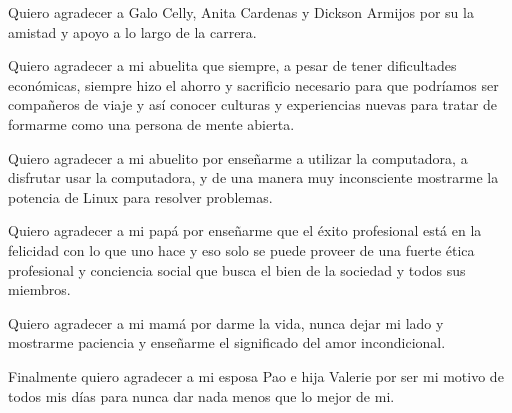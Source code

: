 \documentclass[
11pt, %
spanish, %
singlespacing, %
headsepline, %
]{MastersDoctoralThesis} %
\begin{document}
\begin{acknowledgements}
Quiero agradecer a Galo Celly, Anita Cardenas y Dickson Armijos por su la amistad y apoyo a lo largo de la carrera.

Quiero agradecer a mi abuelita que siempre, a pesar de tener dificultades económicas, siempre hizo el ahorro y sacrificio necesario para que podríamos ser compañeros de viaje y así conocer culturas y experiencias nuevas para tratar de formarme como una persona de mente abierta.

Quiero agradecer a mi abuelito por enseñarme a utilizar la computadora, a disfrutar usar la computadora, y de una manera muy inconsciente mostrarme la potencia de Linux para resolver problemas.

Quiero agradecer a mi papá por enseñarme que el éxito profesional está en la felicidad con lo que uno hace y eso solo se puede proveer de una fuerte ética profesional y conciencia social que busca el bien de la sociedad y todos sus miembros.

Quiero agradecer a mi mamá por darme la vida, nunca dejar mi lado y mostrarme paciencia y enseñarme el significado del amor incondicional.

Finalmente quiero agradecer a mi esposa Pao e hija Valerie por ser mi motivo de todos mis días para nunca dar nada menos que lo mejor de mi.
\end{acknowledgements}


\tableofcontents %

\listoffigures %

\listoftables %

\end{document}
